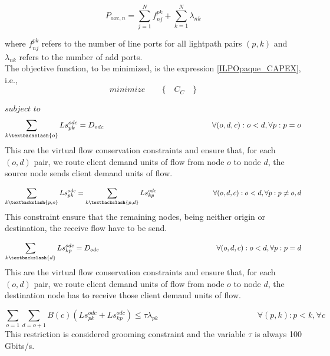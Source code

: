 \begin{equation}
P_{oxc,n} = \sum_{j=1}^{N} f_{nj}^{pk} + \sum_{k=1}^{N} \lambda_{nk}
\label{OXC_poxc_transluc}
\end{equation}

\vspace{11pt}
\noindent
where $f_{nj}^{pk}$ refers to the number of line ports for all lightpath pairs $(p,k)$ and $\lambda_{nk}$ refers to the number of add ports.\\

The objective function, to be minimized, is the expression \ref{ILPOpaque_CAPEX}, i.e.,
\begin{equation*}
  minimize \qquad \Big\{ \quad C_C \quad \Big\}
\end{equation*}

$subject$ $to$
\begin{equation}
\sum_{k\textbackslash \{o\}} Ls_{pk}^{odc} = D_{odc} \qquad \qquad \qquad \qquad \qquad \qquad \qquad
\forall(o,d,c) : o < d, \forall p: p = o
\label{ILPTransluc1}
\end{equation}
\noindent
This are the virtual flow conservation constraints and ensure that, for each $(o,d)$ pair, we route client demand units of flow from node $o$ to node $d$, the source node sends client demand units of flow.

\begin{equation}
\sum_{k\textbackslash \{p,o\}} Ls_{pk}^{odc} = \sum_{k\textbackslash \{p,d\}} Ls_{kp}^{odc} \qquad \qquad \qquad \qquad
\forall(o,d,c) : o < d, \forall p: p \neq o,d
\label{ILPTransluc2}
\end{equation}
\noindent
This constraint ensure that the remaining nodes, being neither origin or destination, the receive flow have to be send.

\begin{equation}
\sum_{k\textbackslash \{d\}} Ls_{kp}^{odc} = D_{odc} \qquad \qquad \qquad \qquad \qquad \qquad \qquad \qquad
\forall(o,d,c) : o < d, \forall p: p = d
\label{ILPTransluc3}
\end{equation}
\noindent
This are the virtual flow conservation constraints and ensure that, for each $(o,d)$ pair, we route client demand units of flow from node $o$ to node $d$, the destination node has to receive those client demand units of flow.

\begin{equation}
\sum_{o=1} \sum_{d=o+1} B(c)(Ls_{pk}^{odc} + Ls_{kp}^{odc}) \leq  \tau \lambda_{pk} \qquad \qquad \qquad \qquad \qquad \qquad
\forall (p,k) : p < k, \forall c
\label{ILPTransluc4}
\end{equation}
\noindent
This restriction is considered grooming constraint and the variable $\tau$ is always 100 Gbits/s.

